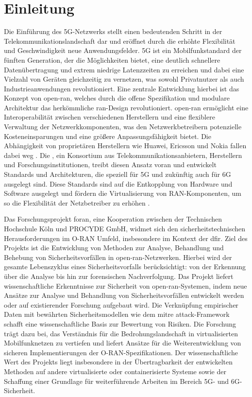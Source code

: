 \chapter{Einleitung}
\label{chap:Einleitung}

\par
Die Einführung des 5G-Netzwerks stellt einen bedeutenden Schritt in der Telekommunikationslandschaft dar und eröffnet durch die erhöhte Flexibilität und Geschwindigkeit neue Anwendungsfelder. 5G ist ein Mobilfunkstandard der fünften Generation, der die Möglichkeiten bietet, eine deutlich schnellere Datenübertragung und extrem niedrige Latenzzeiten zu erreichen und dabei eine Vielzahl von Geräten gleichzeitig zu vernetzen, was sowohl Privatnutzer als auch Industrieanwendungen revolutioniert. Eine zentrale Entwicklung hierbei ist das Konzept von \gls{open-ran}, welches durch die offene Spezifikation und modulare Architektur das herkömmliche \gls{ran}-Design revolutioniert. \gls{open-ran} ermöglicht eine Interoperabilität zwischen verschiedenen Herstellern und eine flexiblere Verwaltung der Netzwerkkomponenten, was den Netzwerkbetreibern potenzielle Kosteneinsparungen und eine größere Anpassungsfähigkeit bietet. Die Abhängigkeit von proprietären Herstellern wie Huawei, Ericsson und Nokia fallen dabei weg \autocite{kimGeopoliticsNextGeneration2023}. Die \orana{}, ein Konsortium aus Telekommunikationsanbietern, Herstellern und Forschungsinstitutionen, treibt diesen Ansatz voran und entwickelt Standards und Architekturen, die speziell für 5G und zukünftig auch für 6G ausgelegt sind. Diese Standards sind auf die Entkopplung von Hardware und Software ausgelegt und fördern die Virtualisierung von RAN-Komponenten, um so die Flexibilität der Netzbetreiber zu erhöhen \autocite{o-ranallianceORANWhitePaper2018102018}.
\par Das Forschungsprojekt \gls{foran}, eine Kooperation zwischen der Technischen Hochschule Köln und PROCYDE GmbH, widmet sich den sicherheitstechnischen Herausforderungen im O-RAN Umfeld, insbesondere im Kontext der \gls{dfir}. Ziel des Projekts ist die Entwicklung von Methoden zur Analyse, Behandlung und Behebung von Sicherheitsvorfällen in \gls{open-ran}-Netzwerken. Hierbei wird der gesamte Lebenszyklus eines Sicherheitsvorfalls berücksichtigt: von der Erkennung über die Analyse bis hin zur forensischen Nachverfolgung. Das Projekt liefert wissenschaftliche Erkenntnisse zur Sicherheit von \gls{open-ran}-Systemen, indem neue Ansätze zur Analyse und Behandlung von Sicherheitsvorfällen entwickelt werden oder auf existierender Forschung aufgebaut wird. Die Verknüpfung empirischer Daten mit bewährten Sicherheitsmodellen wie dem \gls{mitre} \gls{attack}-Framework schafft eine wissenschaftliche Basis zur Bewertung von Risiken. Die Forschung trägt dazu bei, das Verständnis für die Bedrohungslandschaft in virtualisierten Mobilfunknetzen zu vertiefen und liefert Ansätze für die Weiterentwicklung von sicheren Implementierungen der O-RAN-Spezifikationen. Der wissenschaftliche Wert des Projekts liegt insbesondere in der Übertragbarkeit der entwickelten Methoden auf andere virtualisierte oder containerisierte Systeme sowie der Schaffung einer Grundlage für weiterführende Arbeiten im Bereich 5G- und 6G-Sicherheit.
